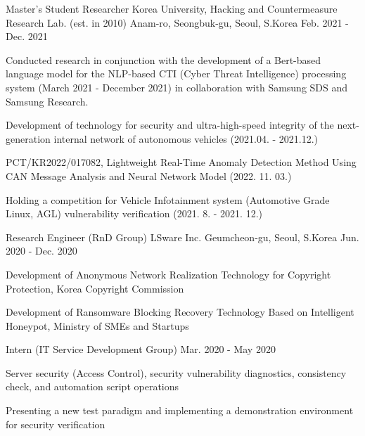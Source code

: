 \begin{cventries}
  \cventry
    {Master's Student Researcher} %
    {Korea University, Hacking and Countermeasure Research Lab. (est. in 2010)} %
    {Anam-ro, Seongbuk-gu, Seoul, S.Korea} %
    {Feb. 2021 - Dec. 2021} %
    {
      \begin{cvitems} %
        \item {Conducted research in conjunction with the development of a Bert-based language model for the NLP-based CTI (Cyber Threat Intelligence) processing system (March 2021 - December 2021) in collaboration with Samsung SDS and Samsung Research.}
        \item {Development of technology for security and ultra-high-speed integrity of the next-generation internal network of autonomous vehicles (2021.04. - 2021.12.)}
        \item {PCT/KR2022/017082, Lightweight Real-Time Anomaly Detection Method Using CAN Message Analysis and Neural Network Model (2022. 11. 03.)}
        \item {Holding a competition for Vehicle Infotainment system (Automotive Grade Linux, AGL) vulnerability verification (2021. 8. - 2021. 12.)}
      \end{cvitems}
    }

  \cventry
    {Research Engineer (RnD Group)} %
    {LSware Inc.} %
    {Geumcheon-gu, Seoul, S.Korea} %
    {Jun. 2020 - Dec. 2020} %
    {
      \begin{cvitems} %
        \item {Development of Anonymous Network Realization Technology for Copyright Protection, Korea Copyright Commission}
        \item {Development of Ransomware Blocking Recovery Technology Based on Intelligent Honeypot, Ministry of SMEs and Startups}
      \end{cvitems}
    }

  \cventry
    {Intern (IT Service Development Group)} %
    {} %
    {} %
    {Mar. 2020 - May 2020} %
    {
      \begin{cvitems} %
        \item {Server security (Access Control), security vulnerability diagnostics, consistency check, and automation script operations}
        \item {Presenting a new test paradigm and implementing a demonstration environment for security verification}
      \end{cvitems}
    }

\end{cventries}
